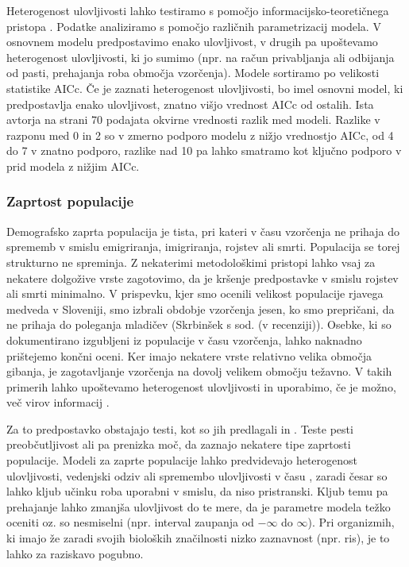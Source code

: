Heterogenost ulovljivosti lahko testiramo s pomočjo informacijsko-teoretičnega pristopa \citep{burnham_model_2002}. Podatke analiziramo s pomočjo različnih parametrizacij modela. V osnovnem modelu predpostavimo enako ulovljivost, v drugih pa upoštevamo heterogenost ulovljivosti, ki jo sumimo (npr. na račun privabljanja ali odbijanja od pasti, prehajanja roba območja vzorčenja). Modele sortiramo po velikosti statistike AICc. Če je zaznati heterogenost ulovljivosti, bo imel osnovni model, ki predpostavlja enako ulovljivost, znatno višjo vrednost AICc od ostalih. Ista avtorja na strani 70 podajata okvirne vrednosti razlik med modeli. Razlike v razponu med 0 in 2 so v zmerno podporo modelu z nižjo vrednostjo AICc, od 4 do 7 v znatno podporo, razlike nad 10 pa lahko smatramo kot ključno podporo v prid modela z nižjim AICc.

\subsubsection[\bfseries Zaprtost populacije]{Zaprtost populacije}
Demografsko zaprta populacija je tista, pri kateri v času vzorčenja ne prihaja do sprememb v smislu emigriranja, imigriranja, rojstev ali smrti. Populacija se torej strukturno ne spreminja. Z nekaterimi metodološkimi pristopi lahko vsaj za nekatere dolgožive vrste zagotovimo, da je kršenje predpostavke v smislu rojstev ali smrti minimalno. V prispevku, kjer smo ocenili velikost populacije rjavega medveda v Sloveniji, smo izbrali obdobje vzorčenja jesen, ko smo prepričani, da ne prihaja do poleganja mladičev (Skrbinšek s sod. (v recenziji)). Osebke, ki so dokumentirano izgubljeni iz populacije v času vzorčenja, lahko naknadno prištejemo končni oceni. Ker imajo nekatere vrste relativno velika območja gibanja, je zagotavljanje vzorčenja na dovolj velikem območju težavno. V takih primerih lahko upoštevamo heterogenost ulovljivosti in uporabimo, če je možno, več virov informacij \citep{boulanger_multiple_2008}.

Za to predpostavko obstajajo testi, kot so jih predlagali \citet{otis_statistical_1978} in \citet{stanley_closure_1999}. Teste pesti preobčutljivost ali pa prenizka moč, da zaznajo nekatere tipe zaprtosti populacije. Modeli za zaprte populacije lahko predvidevajo heterogenost ulovljivosti, vedenjski odziv ali spremembo ulovljivosti v času \citep{otis_statistical_1978}, zaradi česar so lahko kljub učinku roba uporabni v smislu, da niso pristranski. Kljub temu pa prehajanje lahko zmanjša ulovljivost do te mere, da je parametre modela težko oceniti oz. so nesmiselni (npr. interval zaupanja od $-\infty$ do $\infty$). Pri organizmih, ki imajo že zaradi svojih bioloških značilnosti nizko zaznavnost (npr. ris), je to lahko za raziskavo pogubno.


